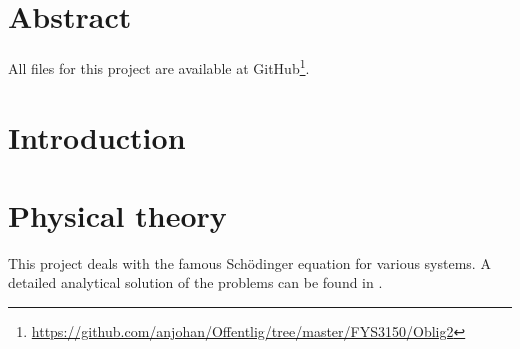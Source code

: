 \documentclass[12pt,english,a4paper]{report}
\begin{document}

\pagestyle{fancy}
\tableofcontents

%

\section{Abstract}

All files for this project are available at GitHub\footnote{\url{https://github.com/anjohan/Offentlig/tree/master/FYS3150/Oblig2}}.

%

\section{Introduction}


\section{Physical theory}
This project deals with the famous Schödinger equation for various systems. A detailed analytical solution of the problems can be found in \autocite{griffiths}.

\end{document}
